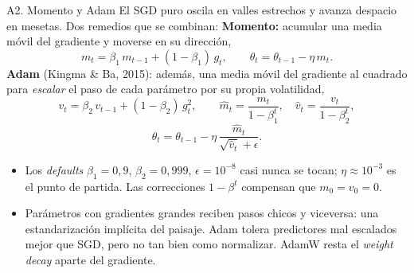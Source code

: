 \documentclass{beamer}
\newcommand{\1}{\mathbb{I}}
\begin{document}
\begin{frame}{A2. Momento y Adam}
\small
El SGD puro oscila en valles estrechos y avanza despacio en mesetas. Dos remedios que se combinan:
\pause
\textbf{Momento:} acumular una media móvil del gradiente y moverse en su dirección,
\[ m_t = \beta_1\, m_{t-1} + (1 - \beta_1)\, g_t, \qquad \theta_t = \theta_{t-1} - \eta\, m_t. \]
\pause
\textbf{Adam} (Kingma \& Ba, 2015): además, una media móvil del gradiente al cuadrado para \emph{escalar} el paso de cada parámetro por su propia volatilidad,
\[ v_t = \beta_2\, v_{t-1} + (1 - \beta_2)\, g_t^2, \qquad \hat{m}_t = \frac{m_t}{1 - \beta_1^t}, \quad \hat{v}_t = \frac{v_t}{1 - \beta_2^t}, \]
\[ \theta_t = \theta_{t-1} - \eta\, \frac{\hat{m}_t}{\sqrt{\hat{v}_t} + \epsilon}. \]
\pause
\begin{itemize}\itemsep2pt
  \item Los \emph{defaults} $\beta_1 = 0{,}9$, $\beta_2 = 0{,}999$, $\epsilon = 10^{-8}$ casi nunca se tocan; $\eta \approx 10^{-3}$ es el punto de partida. Las correcciones $1 - \beta^t$ compensan que $m_0 = v_0 = 0$.
  \item Parámetros con gradientes grandes reciben pasos chicos y viceversa: una estandarización implícita del paisaje. Adam tolera predictores mal escalados mejor que SGD, pero no tan bien como normalizar. AdamW resta el \emph{weight decay} aparte del gradiente.
\end{itemize}
\end{frame}
\end{document}
